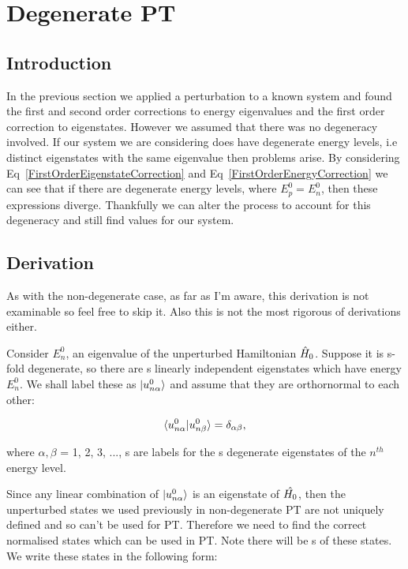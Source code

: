 \chapter{Degenerate PT}
\label{chapt2} 

\section{Introduction}

In the previous section we applied a perturbation to a known system and found the first and second order corrections to energy eigenvalues and the first order correction to eigenstates. However we assumed that there was no degeneracy involved. If our system we are considering does have degenerate energy levels, i.e distinct eigenstates with the same eigenvalue then problems arise. By considering Eq~\ref{FirstOrderEigenstateCorrection} and Eq~\ref{FirstOrderEnergyCorrection} we can see that if there are degenerate energy levels, where $E^0_p = E^0_n$, then these expressions diverge. Thankfully we can alter the process to account for this degeneracy and still find values for our system.

\section{Derivation}

As with the non-degenerate case, as far as I'm aware, this derivation is not examinable so feel free to skip it. Also this is not the most rigorous of derivations either.

\noindent Consider $E^0_n$, an eigenvalue of the unperturbed Hamiltonian $\Hat{H}_0$. Suppose it is s-fold degenerate, so there are s linearly independent eigenstates which have energy $E^0_n$. We shall label these as $\ket{u^0_{n \alpha}}$ and assume that they are orthornormal to each other:

\begin{equation}
        \braket{u^0_{n \alpha} | u^0_{n \beta}} = \delta_{\alpha \beta},
    \label{DegenerateEigenfunctions}
\end{equation}

\noindent where $\alpha, \beta$ = 1, 2, 3, ..., s are labels for the s degenerate eigenstates of the $n^{th}$ energy level.

\noindent Since any linear combination of $\ket{u^0_{n \alpha}}$ is an eigenstate of $\Hat{H_0}$, then the unperturbed states we used previously in non-degenerate PT are not uniquely defined and so can't be used for PT. Therefore we need to find the correct normalised states which can be used in PT. Note there will be s of these states. We write these states in the following form:

